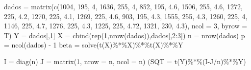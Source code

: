 \documentclass[
]{book}
\newenvironment{Shaded}{\begin{snugshade}}{\end{snugshade}}
\newcommand{\AttributeTok}[1]{\textcolor[rgb]{0.77,0.63,0.00}{#1}}
\newcommand{\DecValTok}[1]{\textcolor[rgb]{0.00,0.00,0.81}{#1}}
\newcommand{\FloatTok}[1]{\textcolor[rgb]{0.00,0.00,0.81}{#1}}
\newcommand{\FunctionTok}[1]{\textcolor[rgb]{0.00,0.00,0.00}{#1}}
\newcommand{\NormalTok}[1]{#1}
\newcommand{\OtherTok}[1]{\textcolor[rgb]{0.56,0.35,0.01}{#1}}
\newcommand{\SpecialCharTok}[1]{\textcolor[rgb]{0.00,0.00,0.00}{#1}}
\begin{document}
\begin{Shaded}
\begin{Highlighting}[]
\NormalTok{dados }\OtherTok{=} \FunctionTok{matrix}\NormalTok{(}\FunctionTok{c}\NormalTok{(}\DecValTok{1004}\NormalTok{, }\DecValTok{195}\NormalTok{, }\DecValTok{4}\NormalTok{,}
                 \DecValTok{1636}\NormalTok{, }\DecValTok{255}\NormalTok{, }\DecValTok{4}\NormalTok{,}
                 \DecValTok{852}\NormalTok{, }\DecValTok{195}\NormalTok{, }\FloatTok{4.6}\NormalTok{,}
                 \DecValTok{1506}\NormalTok{, }\DecValTok{255}\NormalTok{, }\FloatTok{4.6}\NormalTok{,}
                 \DecValTok{1272}\NormalTok{, }\DecValTok{225}\NormalTok{, }\FloatTok{4.2}\NormalTok{,}
                 \DecValTok{1270}\NormalTok{, }\DecValTok{225}\NormalTok{, }\FloatTok{4.1}\NormalTok{,}
                 \DecValTok{1269}\NormalTok{, }\DecValTok{225}\NormalTok{, }\FloatTok{4.6}\NormalTok{,}
                 \DecValTok{903}\NormalTok{, }\DecValTok{195}\NormalTok{, }\FloatTok{4.3}\NormalTok{,}
                 \DecValTok{1555}\NormalTok{, }\DecValTok{255}\NormalTok{, }\FloatTok{4.3}\NormalTok{,}
                 \DecValTok{1260}\NormalTok{, }\DecValTok{225}\NormalTok{, }\DecValTok{4}\NormalTok{,}
                 \DecValTok{1146}\NormalTok{, }\DecValTok{225}\NormalTok{, }\FloatTok{4.7}\NormalTok{,}
                 \DecValTok{1276}\NormalTok{, }\DecValTok{225}\NormalTok{, }\FloatTok{4.3}\NormalTok{,}
                 \DecValTok{1225}\NormalTok{, }\DecValTok{225}\NormalTok{, }\FloatTok{4.72}\NormalTok{,}
                 \DecValTok{1321}\NormalTok{, }\DecValTok{230}\NormalTok{, }\FloatTok{4.3}\NormalTok{), }\AttributeTok{ncol =} \DecValTok{3}\NormalTok{, }\AttributeTok{byrow =}\NormalTok{ T)}
\NormalTok{Y }\OtherTok{=}\NormalTok{ dados[,}\DecValTok{1}\NormalTok{]}
\NormalTok{X }\OtherTok{=} \FunctionTok{cbind}\NormalTok{(}\FunctionTok{rep}\NormalTok{(}\DecValTok{1}\NormalTok{,}\FunctionTok{nrow}\NormalTok{(dados)),dados[,}\DecValTok{2}\SpecialCharTok{:}\DecValTok{3}\NormalTok{])}
\NormalTok{n }\OtherTok{=} \FunctionTok{nrow}\NormalTok{(dados)}
\NormalTok{p }\OtherTok{=} \FunctionTok{ncol}\NormalTok{(dados) }\SpecialCharTok{{-}} \DecValTok{1}
\NormalTok{beta }\OtherTok{=} \FunctionTok{solve}\NormalTok{(}\FunctionTok{t}\NormalTok{(X)}\SpecialCharTok{\%*\%}\NormalTok{X)}\SpecialCharTok{\%*\%}\FunctionTok{t}\NormalTok{(X)}\SpecialCharTok{\%*\%}\NormalTok{Y}

\NormalTok{I }\OtherTok{=} \FunctionTok{diag}\NormalTok{(n)}
\NormalTok{J }\OtherTok{=} \FunctionTok{matrix}\NormalTok{(}\DecValTok{1}\NormalTok{, }\AttributeTok{nrow =}\NormalTok{ n, }\AttributeTok{ncol =}\NormalTok{ n)}
\NormalTok{(}\AttributeTok{SQT =} \FunctionTok{t}\NormalTok{(Y)}\SpecialCharTok{\%*\%}\NormalTok{(I}\SpecialCharTok{{-}}\NormalTok{J}\SpecialCharTok{/}\NormalTok{n)}\SpecialCharTok{\%*\%}\NormalTok{Y)}
\end{Highlighting}
\end{Shaded}
\end{document}
